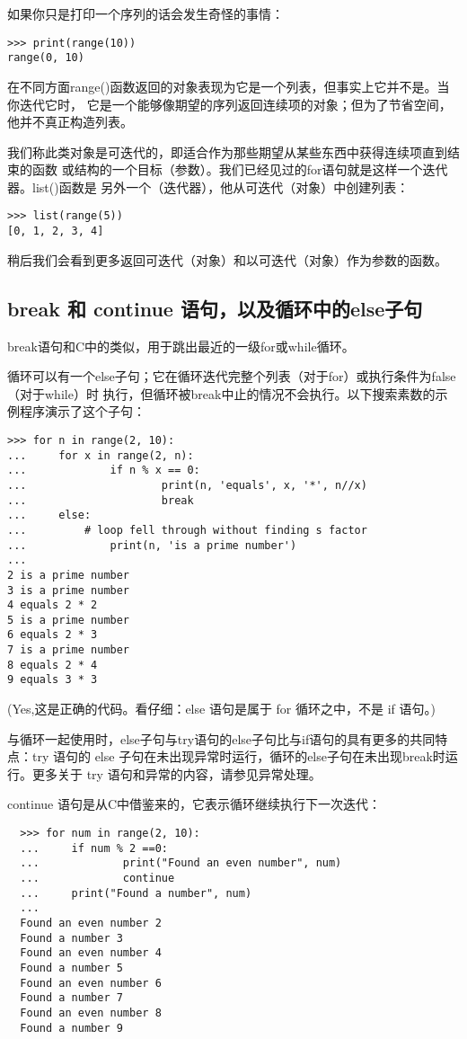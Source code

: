 \documentclass[UTF8]{ctexart}
\begin{document}
如果你只是打印一个序列的话会发生奇怪的事情：
\begin{verbatim}
>>> print(range(10))
range(0, 10)
\end{verbatim}
在不同方面range()函数返回的对象表现为它是一个列表，但事实上它并不是。当你迭代它时，
它是一个能够像期望的序列返回连续项的对象；但为了节省空间，他并不真正构造列表。

我们称此类对象是可迭代的，即适合作为那些期望从某些东西中获得连续项直到结束的函数
或结构的一个目标（参数）。我们已经见过的for语句就是这样一个迭代器。list()函数是
另外一个（迭代器），他从可迭代（对象）中创建列表：
\begin{verbatim}
>>> list(range(5))
[0, 1, 2, 3, 4]
\end{verbatim}
稍后我们会看到更多返回可迭代（对象）和以可迭代（对象）作为参数的函数。

\subsection{break 和 continue 语句，以及循环中的else子句}
break语句和C中的类似，用于跳出最近的一级for或while循环。

循环可以有一个else子句；它在循环迭代完整个列表（对于for）或执行条件为false（对于while）时
执行，但循环被break中止的情况不会执行。以下搜索素数的示例程序演示了这个子句：
\begin{verbatim}
>>> for n in range(2, 10):
...     for x in range(2, n):
...             if n % x == 0:
...                     print(n, 'equals', x, '*', n//x)
...                     break
...     else:
...         # loop fell through without finding s factor
...             print(n, 'is a prime number')
...
2 is a prime number
3 is a prime number
4 equals 2 * 2
5 is a prime number
6 equals 2 * 3
7 is a prime number
8 equals 2 * 4
9 equals 3 * 3
\end{verbatim}
(Yes,这是正确的代码。看仔细：else 语句是属于 for 循环之中，不是 if 语句。)

与循环一起使用时，else子句与try语句的else子句比与if语句的具有更多的共同特点：try 语句的 else
子句在未出现异常时运行，循环的else子句在未出现break时运行。更多关于 try 语句和异常的内容，请参见异常处理。

continue 语句是从C中借鉴来的，它表示循环继续执行下一次迭代：
\begin{verbatim}
  >>> for num in range(2, 10):
  ...     if num % 2 ==0:
  ...             print("Found an even number", num)
  ...             continue
  ...     print("Found a number", num)
  ...
  Found an even number 2
  Found a number 3
  Found an even number 4
  Found a number 5
  Found an even number 6
  Found a number 7
  Found an even number 8
  Found a number 9
\end{verbatim}
\end{document}
